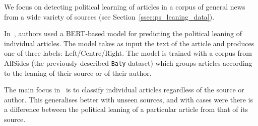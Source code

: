 We focus on detecting political learning of articles in a corpus of general news from a wide variety of sources (see Section~\ref{ssec:ps_leaning_data}). %



 

In~\citet{baly2020we}, authors used a BERT-based model for predicting the political leaning of individual articles. The model takes as input the text of the article and produces one of three labels: Left/Centre/Right. The model is trained with a corpus from AllSides  (the previously described \texttt{Baly} dataset) which groups articles %
according to the leaning of their source or of their author. %


The main focus in~\citet{baly2020we} is to classify individual articles regardless of the source or author. This generalises better with unseen sources, and with cases were there is a difference between the political leaning of a particular article from that of its source.



